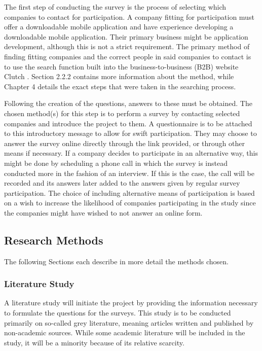 \documentclass[a4paper,12pt]{article}
\begin{document}
The first step of conducting the survey is the process of selecting which companies to contact for participation. A company fitting for participation must offer a downloadable mobile application and have experience developing a downloadable mobile application. Their primary business might be application development, although this is not a strict requirement. The primary method of finding fitting companies and the correct people in said companies to contact is to use the search function built into the business-to-business (B2B) website Clutch \cite{clutch}. Section 2.2.2 contains more information about the method, while Chapter 4 details the exact steps that were taken in the searching process.

Following the creation of the questions, answers to these must be obtained. The chosen method(s) for this step is to perform a survey by contacting selected companies and introduce the project to them. A questionnaire is to be attached to this introductory message to allow for swift participation. They may choose to answer the survey online directly through the link provided, or through other means if necessary. If a company decides to participate in an alternative way, this might be done by scheduling a phone call in which the survey is instead conducted more in the fashion of an interview. If this is the case, the call will be recorded and its answers later added to the answers given by regular survey participation. The choice of including alternative means of participation is based on a wish to increase the likelihood of companies participating in the study since the companies might have wished to not answer an online form.


\subsection{Research Methods}
\label{Method_methods}
The following Sections each describe in more detail the methods chosen.

\subsubsection{Literature Study}
\label{Method_methods_study}
A literature study will initiate the project by providing the information necessary to formulate the questions for the surveys. This study is to be conducted primarily on so-called grey literature, meaning articles written and published by non-academic sources. While some academic literature will be included in the study, it will be a minority because of its relative scarcity. 
\end{document}
